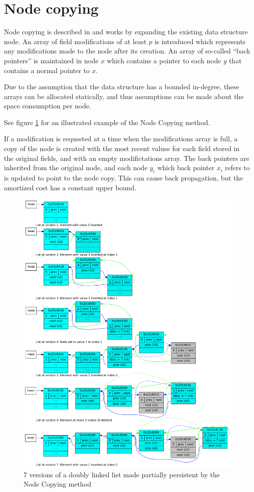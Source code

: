 \section{Node copying}
Node copying is described in \cite{Driscoll198986} and works by expanding the
existing data structure node. An array of field modifications of at least $p$ is
introduced which represents any modifications made to the node after its
creation. An array of so-called ``back pointers'' is maintained in node $x$
which contains a pointer to each node $y$ that contains a normal pointer to $x$.

Due to the assumption that the data structure has a bounded in-degree, these
arrays can be allocated statically, and thus assumptions can be made about the
space consumption per node.

See figure \ref{fig:pp-7-versions.pdf} for an illustrated example of the Node
Copying method.

If a modification is requested at a time when the modifications array is full, a
copy of the node is created with the most recent values for each field stored in
the original fields, and with an empty modifictations array. The back pointers
are inherited from the original node, and each node $y_i$ which back pointer
$x_i$ refers to is updated to point to the node copy. This can cause back
propagation, but the amortized cost has a constant upper bound.


\begin{figure}[!hbp]
    \includegraphics[width=\textwidth]{figures/pp-7-versions.pdf}
    \caption{7 versions of a doubly linked list made  partially persistent by
    the Node Copying method}
    \label{fig:pp-7-versions.pdf}
\end{figure}